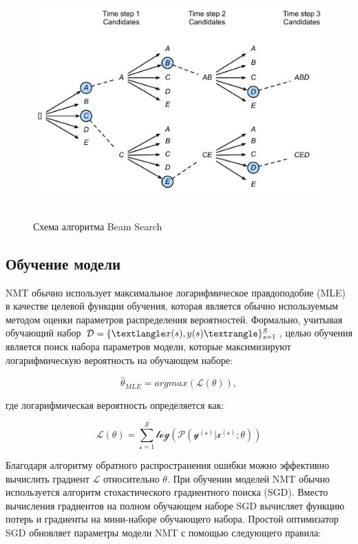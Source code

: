 	\begin{figure}[ht!]
		\centering
		\captionsetup{justification=centering}
		\includegraphics[height=90mm]{img/beam-search.png}
		\caption{Схема алгоритма Beam Search}
	\end{figure}
	
	
	\subsection{Обучение модели}
	
	NMT обычно использует максимальное логарифмическое правдоподобие (MLE) в качестве целевой функции обучения, которая является обычно используемым методом оценки параметров распределения вероятностей. Формально, учитывая обучающий набор $ \mathcal{D} = \{\textlangle x(s), y(s) \textrangle\}_{s=1}^S $, целью обучения является поиск набора параметров модели, которые максимизируют логарифмическую вероятность на обучающем наборе:
	
	$$
	    \hat{\theta}_{MLE} = argmax(\mathscr{L}(\theta)),
	$$

    где логарифмическая вероятность определяется как:
    
    $$
      \mathscr{L(\theta)=\sum_{s=1}^S log(P(y^{(s)}|x^{(s)};\theta))}  
    $$
    
    Благодаря алгоритму обратного распространения ошибки можно эффективно вычислить градиент $\mathscr{L}$ относительно $\theta$. При обучении моделей NMT обычно используется алгоритм стохастического градиентного поиска (SGD). Вместо вычисления градиентов на полном обучающем наборе SGD вычисляет функцию потерь и градиенты на мини-наборе обучающего набора. Простой оптимизатор SGD обновляет параметры модели NMT с помощью следующего правила:
    
